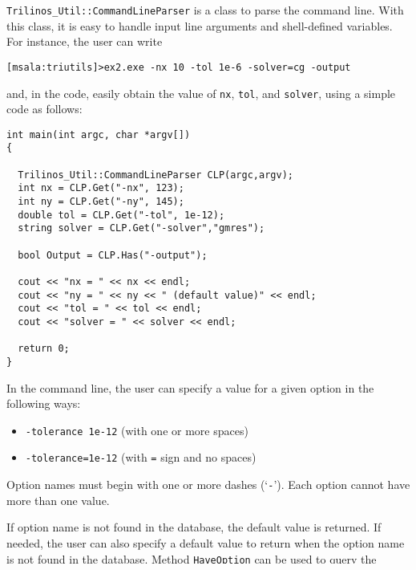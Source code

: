 \verb!Trilinos_Util::CommandLineParser! is a class to parse the command
line.  With this class, it is easy to handle input line arguments and
shell-defined variables. For instance, the user can write
\begin{verbatim}
[msala:triutils]>ex2.exe -nx 10 -tol 1e-6 -solver=cg -output
\end{verbatim}
and, in the code, easily obtain the value of {\tt nx}, {\tt tol}, and
{\tt solver}, using a simple code as follows:
\begin{verbatim}
int main(int argc, char *argv[])
{

  Trilinos_Util::CommandLineParser CLP(argc,argv);
  int nx = CLP.Get("-nx", 123);
  int ny = CLP.Get("-ny", 145);
  double tol = CLP.Get("-tol", 1e-12);
  string solver = CLP.Get("-solver","gmres");

  bool Output = CLP.Has("-output");

  cout << "nx = " << nx << endl;
  cout << "ny = " << ny << " (default value)" << endl;
  cout << "tol = " << tol << endl;
  cout << "solver = " << solver << endl;

  return 0;
}
\end{verbatim}
In the command line, the user can specify a value for a given option in
the following ways:
\begin{itemize}
\item \verb!-tolerance 1e-12! (with one or more spaces)
\item \verb!-tolerance=1e-12! (with \verb!=! sign and no spaces)
\end{itemize}

Option names must begin with one or more dashes (`\verb!-!'). Each option
cannot have more than one value.
 
If option name is not found in the database, the default value is
returned. If needed, the user can also specify a default value to return
when the option name is not found in the database. Method
\verb!HaveOption! can be used to query the database for an option.

File  gives an example of the usage of this class.
 

\subsection{Trilinos\_Util::CrsMatrixGallery}
\label{sec:triutils:gallery}

\verb!Trilinos_Util::CrsMatrixGallery! is a class to Epetra\_CrsMatrix
and Epetra\_LinearProblem. It is meant to provide functionalities
similar to the MATLAB's \verb!gallery! function\footnote{Many of the
  matrices that can be created using Trilinos\_Util::CrsMatrixGallery
  are equivalent or simiilar to those provided by the
  MATLAB\copyright~function {\tt gallery}. In these cases, the reader is
  referred to the MATLAB documentation for more details about the
  matrices' properties.}.

